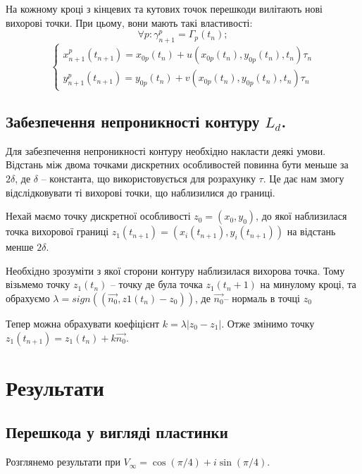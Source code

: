 \documentclass[a4paper,12pt]{article}
\begin{document}
	На кожному кроці з кінцевих та кутових точок перешкоди вилітають нові вихорові точки. При цьому, вони мають такі властивості:
	\[
		\forall p: \gamma_{n+1}^{p} = \Gamma_p(t_n);
	\]
	\begin{equation*}
		\begin{cases}
			x_{n+1}^{p}(t_{n+1}) = x_{0p}(t_n) + u(x_{0p}(t_n), y_{0p}(t_n), t_n)\tau_n
			\\
			y_{n+1}^{p}(t_{n+1}) = y_{0p}(t_n) + v(x_{0p}(t_n), y_{0p}(t_n), t_n)\tau_n
		\end{cases}
	\end{equation*}
	
	\subsection{Забезпечення непроникності контуру $L_d$.}
	
		Для забезпечення непроникності контуру необхідно накласти деякі умови. Відстань між двома точками дискретних особливостей повинна бути меньше за $2\delta$, де $\delta$ -- константа, що використовується для розрахунку $\tau$. Це дає нам змогу відслідковувати ті вихорові точки, що наблизилися до границі.
		
		Нехай маємо точку дискретної особливості $z_0 = (x_0, y_0)$, до якої наблизилася точка вихорової границі $z_1(t_{n+1}) = (x_i(t_{n+1}), y_i(t_{n+1}))$ на відстань менше $2 \delta$.
		
		Необхідно зрозуміти з якої сторони контуру наблизилася вихорова точка. Тому візьмемо точку $z_1(t_{n})$ -- точку де була точка $z_1(t_n+1)$ на минулому кроці, та обрахуємо $\lambda = sign \left( (\vec{n_0}, z1(t_n) - z_0) \right)$, де $\vec{n_0}$-- нормаль в точці $z_0$
		
		 Тепер можна обрахувати коефіцієнт $k = \lambda|z_0 - z_1|$. Отже змінимо точку $z_1(t_{n+1}) = z_1(t_n) + k\vec{n_0}$.
		
\section{Результати}
	\subsection{Перешкода у вигляді пластинки}
		Розглянемо результати при $V_{\infty} = \cos(\pi/4) + i\sin(\pi/4)$.
		
\end{document}
